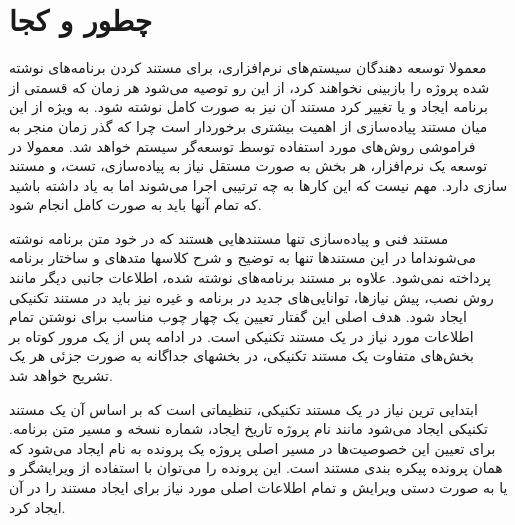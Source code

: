 %
% 
% 
% 
%

\chapter{چطور و کجا}

معمولا توسعه دهندگان سیستم‌های نرم‌افزاری، برای مستند کردن برنامه‌های نوشته شده
پروژه را بازبینی نخواهند کرد، از این رو توصیه می‌شود هر زمان که قسمتی از برنامه ایجاد و یا تغییر کرد
مستند آن نیز به صورت کامل نوشته شود. به ویژه از این میان مستند پیاده‌سازی از اهمیت بیشتری
برخوردار است چرا که گذر زمان منجر به فراموشی روش‌های مورد استفاده توسط
توسعه‌‌گر سیستم خواهد شد. معمولا در توسعه یک نرم‌افزار، هر بخش به صورت
مستقل نیاز به پیاده‌سازی، تست، و مستند سازی دارد. مهم نیست که این کارها به چه
ترتیبی اجرا می‌شوند اما به یاد داشته باشید که تمام آنها باید به صورت کامل انجام
شود.

  مستند فنی و پیاده‌سازی تنها مستندهایی هستند که در خود متن برنامه نوشته
  می‌شونداما در این مستندها تنها به توضیح و شرح کلاسها متدهای و ساختار برنامه
  پرداخته نمی‌شود. علاوه بر مستند برنامه‌های نوشته شده،
  اطلاعات جانبی دیگر مانند روش نصب، پیش نیازها، توانایی‌های جدید در برنامه و
  غیره نیز باید در مستند تکنیکی ایجاد شود. هدف اصلی این گفتار
  تعیین یک چهار چوب مناسب برای نوشتن تمام اطلاعات مورد نیاز در یک مستند تکنیکی
  است. در ادامه پس  از یک مرور کوتاه بر بخش‌های متفاوت یک مستند تکنیکی، در
  بخشهای جداگانه به صورت جزئی هر یک تشریح خواهد شد.

  ابتدایی ترین نیاز در یک مستند تکنیکی، تنظیماتی است که بر اساس آن یک
  مستند تکنیکی ایجاد می‌شود مانند نام پروژه تاریخ ایجاد، شماره نسخه و مسیر متن
  برنامه. برای تعیین این خصوصیت‌ها در مسیر اصلی پروژه یک پرونده به نام
   ایجاد می‌شود که همان پرونده پیکره بندی مستند است. این پرونده را
  می‌توان با استفاده از ویرایشگر  و یا به صورت دستی ویرایش و
  تمام اطلاعات اصلی مورد نیاز برای ایجاد مستند را در آن ایجاد کرد.

